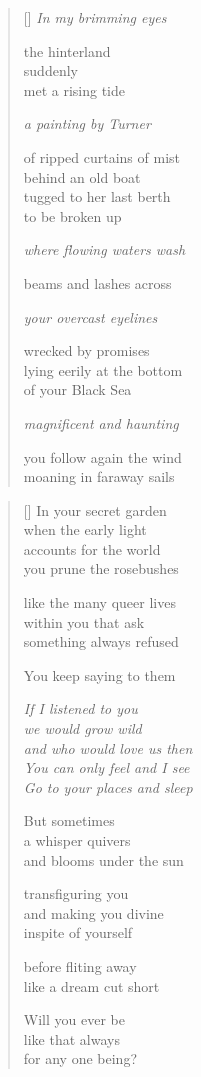 \documentclass[12pt,a4paper]{article}
\begin{document}
\begin{verse}[\versewidth]
\emph{In my brimming eyes}

the hinterland \\
suddenly \\
met a rising tide

\emph{a painting by Turner}

of ripped curtains of mist \\
behind an old boat \\
tugged to her last berth \\
to be broken up

\emph{where flowing waters wash}

beams and lashes across

\emph{your overcast eyelines}

wrecked by promises \\
lying eerily at the bottom \\
of your Black Sea

\emph{magnificent and haunting}

you follow again the wind \\
moaning in faraway sails
\end{verse}


\newpage

\poemtitle{}

\settowidth{\versewidth}{and who would love us then}

\bigskip

\begin{verse}[\versewidth]
  In your secret garden \\
  when the early light \\
  accounts for the world \\
  you prune the rosebushes

  like the many queer lives \\
  within you that ask \\
  something always refused

  You keep saying to them

  \emph{If I listened to you \\
  we would grow wild \\
  and who would love us then \\
  You can only feel and I see \\
  Go to your places and sleep}

  But sometimes \\
  a whisper quivers \\
  and blooms under the sun

  transfiguring you \\
  and making you divine \\
  inspite of yourself

  before fliting away \\
  like a dream cut short

  Will you ever be \\
  like that always \\
  for any one being?
\end{verse}
\end{document}
